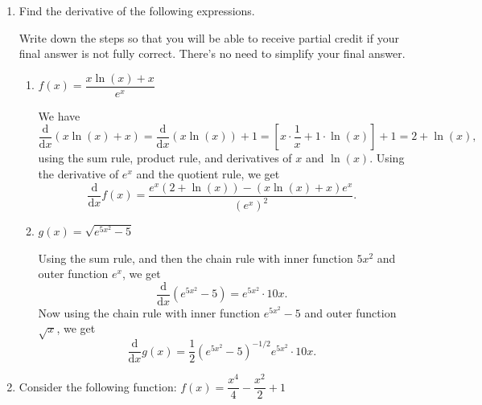 \documentclass[11pt]{article}
\begin{document}
\begin{enumerate}
\newpage


\item Find the derivative of the following expressions. 

Write down the steps so that you will be able to receive partial credit if your final answer is not fully correct. There's no need to simplify your final answer.

\begin{enumerate}
\item $f(x) = \dfrac{x \ln(x) + x}{e^x}$
\medskip

{\color{blue}
We have 
\[
\frac{\mathrm{d}}{\mathrm{d}x} (x \ln(x) + x) = \frac{\mathrm{d}}{\mathrm{d}x} (x \ln(x) ) + 1 = [x \cdot \frac{1}{x} + 1 \cdot \ln(x)] + 1 = 2 + \ln(x),
\]
using the sum rule, product rule, and derivatives of $x$ and $\ln(x)$. Using the derivative of $e^x$ and the quotient rule, we get
\[
\frac{\mathrm{d}}{\mathrm{d}x}f(x) = \frac{e^x(2+\ln(x)) - (x \ln(x)+x)e^x}{(e^{x})^2}.
\]
}
\bigskip

\item $g(x) = \sqrt{e^{5x^2}-5}$
\medskip

{\color{blue}
Using the sum rule, and then the chain rule with inner function $5x^2$ and outer function $e^x$, we get
\[
\frac{\mathrm{d}}{\mathrm{d}x}(e^{5x^2}-5) = e^{5x^2}\cdot 10 x.
\]
Now using the chain rule with inner function $e^{5x^2}-5$ and outer function $\sqrt{x}$, we get
\[
\frac{\mathrm{d}}{\mathrm{d}x}g(x) = \frac12 (e^{5x^2}-5)^{-1/2} e^{5x^2} \cdot 10 x.
\]

}

\end{enumerate}



\newpage


\item Consider the following function:
$f(x) = \dfrac{x^4}{4} - \dfrac{x^2}{2} + 1$


\end{enumerate}
\end{document}
